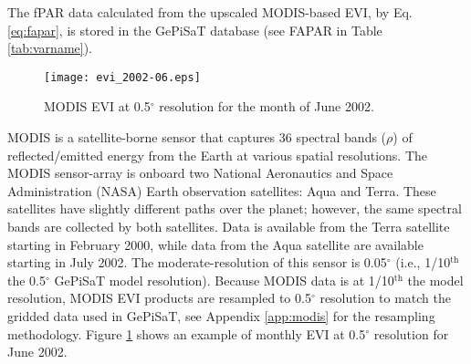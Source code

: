 \noindent The fPAR data calculated from the upscaled MODIS-based EVI, by Eq. \ref{eq:fapar}, is stored in the GePiSaT database (see FAPAR in Table \ref{tab:varname}).
\begin{figure}[ht!]
    \texttt{[image: evi\_2002-06.eps]}
    \caption{MODIS EVI at 0.5$^{\circ}$ resolution for the month of June 
    2002.}
    \label{fig:modisevi}
\end{figure}

MODIS is a satellite-borne sensor that captures 36 spectral bands ($\rho$) of reflected/emitted energy from the Earth at various spatial resolutions.  
The MODIS sensor-array is onboard two National Aeronautics and Space Administration (NASA) Earth observation satellites: Aqua and Terra.  
These satellites have slightly different paths over the planet; however, the same spectral bands are collected by both satellites.  
Data is available from the Terra satellite starting in February 2000, while data from the Aqua satellite are available starting in July 2002.  
The moderate-resolution of this sensor is 0.05$^{\circ}$ (i.e., 1/10$^{\text{th}}$ the 0.5$^{\circ}$ GePiSaT model resolution).
Because MODIS data is at 1/10$^{\text{th}}$ the model resolution, MODIS EVI products are resampled to 0.5$^{\circ}$ resolution to match the gridded data used in GePiSaT, see Appendix \ref{app:modis} for the resampling methodology.
Figure \ref{fig:modisevi} shows an example of monthly EVI at 0.5$^{\circ}$ resolution for June 2002. 

